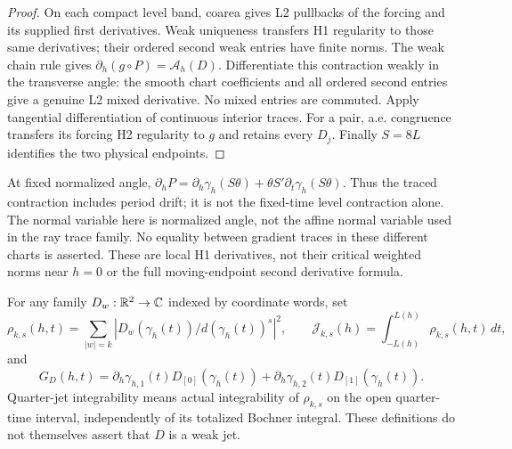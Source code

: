 \begin{proof}
\leanok
On each compact level band, coarea gives L2 pullbacks of the forcing and
its supplied first derivatives. Weak uniqueness transfers H1 regularity
to those same derivatives; their ordered second weak entries have finite norms.
The weak chain rule gives $\partial_h(g\circ P)=\mathcal A_h(D)$.
Differentiate this contraction weakly in the transverse angle:
the smooth chart coefficients and all ordered second entries give a genuine
L2 mixed derivative. No mixed entries are commuted.
Apply tangential differentiation of continuous interior traces.
For a pair, a.e. congruence transfers its forcing H2 regularity to $g$
and retains every $D_j$. Finally $S=8L$ identifies the two physical endpoints.
\end{proof}

\begin{remark}
At fixed normalized angle,
$\partial_hP=\partial_h\gamma_h(S\theta)+\theta S'\partial_t\gamma_h(S\theta)$.
Thus the traced contraction includes period drift; it is not the fixed-time
level contraction alone.
The normal variable here is normalized angle, not the affine normal variable
used in the ray trace family. No equality between gradient traces in these
different charts is asserted. These are local H1 derivatives, not their critical
weighted norms near $h=0$ or the full moving-endpoint second derivative formula.
\end{remark}

\begin{definition}
\label{def:quarter-jet-data}
\leanok
For any family $D_w:\mathbb{R}^2\to\mathbb{C}$ indexed by coordinate words, set
\[
 \rho_{k,s}(h,t)=\sum_{|w|=k}
   |D_w(\gamma_h(t))/d(\gamma_h(t))^s|^2,\qquad
 \mathcal J_{k,s}(h)=\int_{-L(h)}^{L(h)}\rho_{k,s}(h,t)\,dt,
\]
and
\[
 G_D(h,t)=
   \partial_h\gamma_{h,1}(t)D_{[0]}(\gamma_h(t))+
   \partial_h\gamma_{h,2}(t)D_{[1]}(\gamma_h(t)).
\]
Quarter-jet integrability means actual integrability of $\rho_{k,s}$
on the open quarter-time interval, independently of its totalized
Bochner integral. These definitions do not themselves assert that $D$
is a weak jet.
\end{definition}

